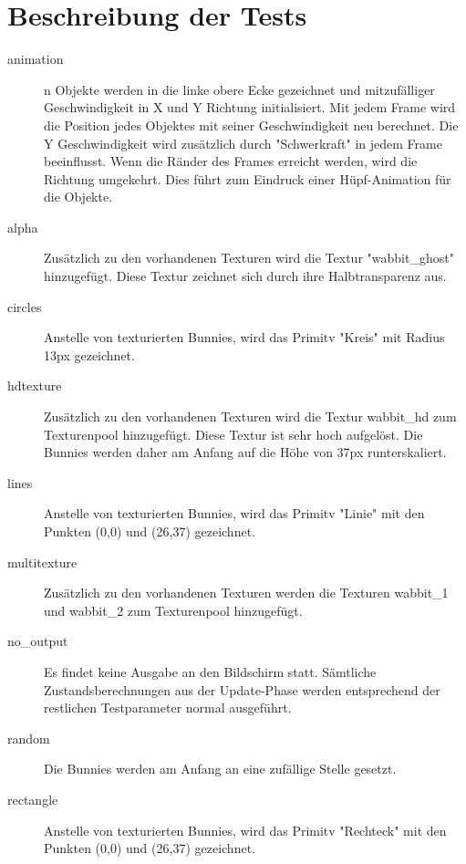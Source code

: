 \section{Beschreibung der Tests}
\label{sec:tests}

\begin{description}
\item[animation] n Objekte werden in die linke obere Ecke gezeichnet und mitzufälliger Geschwindigkeit in X und Y Richtung initialisiert. Mit jedem Frame wird die Position jedes Objektes mit seiner Geschwindigkeit neu berechnet. Die Y Geschwindigkeit wird zusätzlich durch "Schwerkraft" in jedem Frame beeinflusst. Wenn die Ränder des Frames erreicht werden, wird die Richtung umgekehrt. Dies führt zum Eindruck einer Hüpf-Animation für die Objekte. \\
\item[alpha]Zusätzlich zu den vorhandenen Texturen wird die Textur "wabbit\_ghost" hinzugefügt. Diese Textur zeichnet sich durch ihre Halbtransparenz aus. \\                                                                                                                                
\item[circles] Anstelle von texturierten Bunnies, wird das Primitv "Kreis" mit Radius 13px gezeichnet. \\
\item[hdtexture] Zusätzlich zu den vorhandenen Texturen wird die Textur wabbit\_hd zum Texturenpool hinzugefügt. Diese Textur ist sehr hoch aufgelöst. Die Bunnies werden daher am Anfang auf die Höhe von 37px runterskaliert. \\
\item[lines]Anstelle von texturierten Bunnies, wird das Primitv "Linie" mit den Punkten (0,0) und (26,37) gezeichnet. \\
\item[multitexture] Zusätzlich zu den vorhandenen Texturen werden die Texturen wabbit\_1 und wabbit\_2 zum Texturenpool hinzugefügt. \\
\item[no\_output] Es findet keine Ausgabe an den Bildschirm statt. Sämtliche Zustandsberechnungen aus der Update-Phase werden entsprechend der restlichen Testparameter normal ausgeführt. \\
\item[random] Die Bunnies werden am Anfang an eine zufällige Stelle gesetzt. \\                                   
\item[rectangle] Anstelle von texturierten Bunnies, wird das Primitv "Rechteck" mit den Punkten (0,0) und (26,37) gezeichnet. \\

\end{description}
